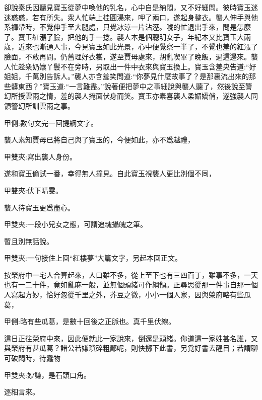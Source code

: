 \begin{parag}
    卻說秦氏因聽見寶玉從夢中喚他的乳名，心中自是納悶，又不好細問。彼時寶玉迷迷惑惑，若有所失。衆人忙端上桂圓湯來，呷了兩口，遂起身整衣。襲人伸手與他系褲帶時，不覺伸手至大腿處，只覺冰涼一片沾溼。唬的忙退出手來，問是怎麼了。寶玉紅漲了臉，把他的手一捻。襲人本是個聰明女子，年紀本又比寶玉大兩歲，近來也漸通人事，今見寶玉如此光景，心中便覺察一半了，不覺也羞的紅漲了臉面，不敢再問。仍舊理好衣裳，遂至賈母處來，胡亂喫畢了晚飯，過這邊來。襲人忙趁衆奶孃丫鬟不在旁時，另取出一件中衣來與寶玉換上。寶玉含羞央告道:“好姐姐，千萬別告訴人。”襲人亦含羞笑問道:“你夢見什麼故事了？是那裏流出來的那些髒東西？”寶玉道:“一言難盡。”說著便把夢中之事細說與襲人聽了，然後說至警幻所授雲雨之情，羞的襲人掩面伏身而笑。寶玉亦素喜襲人柔媚嬌俏，遂強襲人同領警幻所訓雲雨之事。\begin{note}甲側:數句文完一回提綱文字。\end{note}襲人素知賈母已將自己與了寶玉的，今便如此，亦不爲越禮，\begin{note}甲雙夾:寫出襲人身份。\end{note}遂和寶玉偷試一番，幸得無人撞見。自此寶玉視襲人更比別個不同，\begin{note}甲雙夾:伏下晴雯。\end{note}襲人待寶玉更爲盡心。\begin{note}甲雙夾:一段小兒女之態，可謂追魂攝魄之筆。\end{note}暫且別無話說。\begin{note}甲雙夾:一句接住上回“紅樓夢”大篇文字，另起本回正文。\end{note}
\end{parag}


\begin{parag}
    按榮府中一宅人合算起來，人口雖不多，從上至下也有三四百丁，雖事不多，一天也有一二十件，竟如亂麻一般，並無個頭緒可作綱領。正尋思從那一件事自那一個人寫起方妙，恰好忽從千里之外，芥豆之微，小小一個人家，因與榮府略有些瓜葛，\begin{note}甲側:略有些瓜葛，是數十回後之正脈也。真千里伏線。 \end{note}這日正往榮府中來，因此便就此一家說來，倒還是頭緒。你道這一家姓甚名誰，又與榮府有甚瓜葛？諸公若嫌瑣碎粗鄙呢，則快擲下此書，另覓好書去醒目；若謂聊可破悶時，待蠢物\begin{note}甲雙夾:妙謙，是石頭口角。\end{note}逐細言來。
\end{parag}


